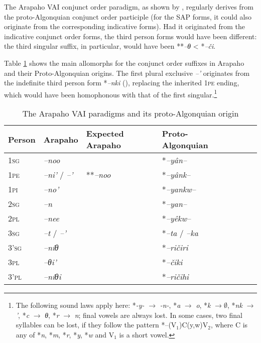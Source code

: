 \documentclass[twoside,a4paper,11pt]{article}
\newcommand{\ipa}[1]{{\phon\textit{#1}}}
\newcommand{\sg}{\textsc{sg}}
\newcommand{\pl}{\textsc{pl}}
\newcommand{\grise}[1]{\cellcolor{lightgray}\textbf{#1}}
\newcommand{\Σ}{\greek{Σ}}
\newcommand{\pli}{\textsc{pi}}
\newcommand{\pe}{\textsc{pe}}
\begin{document}
The Arapaho VAI conjunct order paradigm, as shown by \citet[16-7]{goddard65arapaho}, regularly derives from the proto-Algonquian conjunct order participle (for the SAP forms, it could also originate from the corresponding indicative forms). Had it originated from the indicative conjunct order forms, the third person forms would have been different: the third singular suffix, in particular, would have been **\ipa{--θ} < *\ipa{--či}.

Table \ref{tab:arapaho.vai} shows the main  allomorphs for the conjunct order suffixes in Arapaho and their Proto-Algonquian origins. The first plural exclusive \ipa{--'} originates from the indefinite third person form *\ipa{--nki} (\citealt{goddard98morphology.arapaho}), replacing the inherited 1\pe{} ending, which would have been homophonous with that of the first singular.\footnote{The following sound laws apply here: *\ipa{-y-} $\rightarrow$ \ipa{-n-}, *\ipa{a} $\rightarrow$ \ipa{o}, *\ipa{k} $\rightarrow \emptyset $, *\ipa{nk} $\rightarrow$ \ipa{'}, *\ipa{c} $\rightarrow$ \ipa{θ},  *\ipa{r} $\rightarrow$ \ipa{n}; final vowels are always lost. In some cases, two final syllables can be lost, if they follow the pattern *--(V${_1}$)C(y,w)V${_2}$, where C is any of *\ipa{n}, *\ipa{m}, *\ipa{r}, *\ipa{y}, *\ipa{w} and V${_1}$ is a short vowel. }


\begin{table}[H]
\caption{The Arapaho VAI paradigms and its proto-Algonquian origin}
\centering \label{tab:arapaho.vai}
\begin{tabular}{lllllll}
\toprule
Person &   Arapaho    & Expected Arapaho &Proto-Algonquian\\
\midrule
1\sg{}& 	\ipa{--noo} & & 	*\ipa{--yân--} & 	\\	
1\pe{} & 	\ipa{--ni'} /  	\ipa{--'} \grise{} & **\ipa{--noo}	&	 *\ipa{--yânk--}	 \\	
1\pli{} & 	\ipa{--no'} & 	 	&	*\ipa{--yankw--} & 	\\	
\midrule
2\sg{}& 	\ipa{--n} & 	 &	*\ipa{--yan--} & 	\\	
2\pl{}& 	\ipa{--nee} & 	 & 		*\ipa{--yêkw--} & 	\\	
\midrule
3\sg{} & 	\ipa{--t} /	\ipa{--'} & 	&	*\ipa{--ta} / \ipa{--ka}& 	\\	
3'\sg{} & 	\ipa{--níθ} &  	&	*\ipa{--ričiri} & 	\\	
3\pl{}& 	\ipa{--θi'} &  	&	*\ipa{--čiki} 	\\	
3'\pl{}& 	\ipa{--níθi} & 	 &		*\ipa{--ričihi} 	\\	
\bottomrule
\end{tabular}
\end{table}
\end{document}
